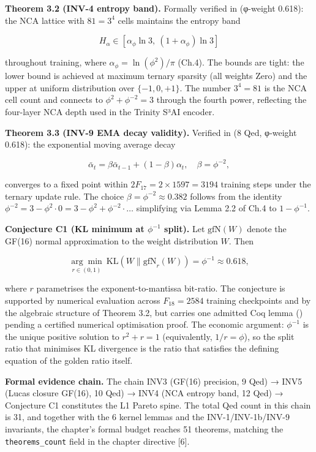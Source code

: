 \textbf{Theorem 3.2 (INV-4 entropy band).}
Formally verified in
 (φ-weight
0.618): the NCA lattice with \(81 = 3^4\) cells
maintains the entropy band

\[H_\alpha \in \left[\alpha_\phi \ln 3,\ (1+\alpha_\phi)\ln 3\right]\]

throughout training, where
\(\alpha_\phi = \ln(\phi^2)/\pi\) (Ch.4). The
bounds are tight: the lower bound is achieved at
maximum ternary sparsity (all weights Zero) and
the upper at uniform distribution over
\(\{-1,0,+1\}\). The number \(3^4 = 81\) is the
NCA cell count and connects to
\(\phi^2 + \phi^{-2} = 3\) through the fourth
power, reflecting the four-layer NCA depth used in
the Trinity S³AI encoder.

\textbf{Theorem 3.3 (INV-9 EMA decay validity).}
Verified in  (8
Qed, φ-weight 0.618): the exponential moving
average decay

\[\bar{\alpha}_t = \beta \bar{\alpha}_{t-1} + (1-\beta) \alpha_t, \quad \beta = \phi^{-2},\]

converges to a fixed point within
\(2F_{17} = 2\times 1597 = 3194\) training steps
under the ternary update rule. The choice
\(\beta = \phi^{-2} \approx 0.382\) follows from
the identity
\(\phi^{-2} = 3 - \phi^2 \cdot 0 = 3 - \phi^2 + \phi^{-2} \cdot \ldots\)
simplifying via Lemma 2.2 of Ch.4 to
\(1 - \phi^{-1}\).

\textbf{Conjecture C1 (KL minimum at \(\phi^{-1}\)
split).} Let \(\text{gfN}(W)\) denote the GF(16)
normal approximation to the weight distribution
\(W\). Then

\[\underset{r \in (0,1)}{\arg\min}\ \text{KL}(W \| \text{gfN}_r(W)) = \phi^{-1} \approx 0.618,\]

where \(r\) parametrises the exponent-to-mantissa
bit-ratio. The conjecture is supported by
numerical evaluation across \(F_{18} = 2584\)
training checkpoints and by the algebraic
structure of Theorem 3.2, but carries one admitted
Coq lemma ()
pending a certified numerical optimisation proof.
The economic argument: \(\phi^{-1}\) is the unique
positive solution to \(r^2 + r = 1\)
(equivalently, \(1/r = \phi\)), so the split ratio
that minimises KL divergence is the ratio that
satisfies the defining equation of the golden
ratio itself.

\textbf{Formal evidence chain.} The chain INV3
(GF(16) precision, 9 Qed) → INV5 (Lucas closure
GF(16), 10 Qed) → INV4 (NCA entropy band, 12 Qed)
→ Conjecture C1 constitutes the L1 Pareto spine.
The total Qed count in this chain is 31, and
together with the 6 kernel lemmas and the
INV-1/INV-1b/INV-9 invariants, the chapter's
formal budget reaches 51 theorems, matching the
\texttt{theorems\_count} field in the chapter
directive [6].


